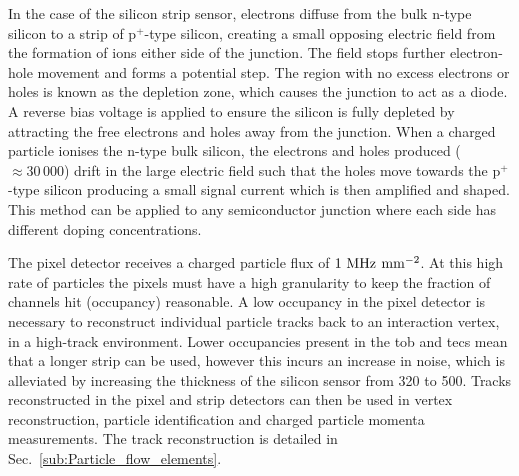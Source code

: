 In the case of the silicon strip sensor, electrons diffuse from the bulk n-type silicon to a strip of p$^{+}$-type silicon, creating a small opposing electric field from the formation of ions either side of the \pnjunc{} junction.
The field stops further electron-hole movement and forms a potential step.
The region with no excess electrons or holes is known as the depletion zone, which causes the junction to act as a diode.
A reverse bias voltage is applied to ensure the silicon is fully depleted by attracting the free electrons and holes away from the \pnjunc{} junction.
When a charged particle ionises the n-type bulk silicon, the electrons and holes produced ($\approx 30\,000$) drift in the large electric field such that the holes move towards the p$^{+}$-type silicon producing a small signal current which is then amplified and shaped.
This method can be applied to any semiconductor junction where each side has different doping concentrations.

The pixel detector receives a charged particle flux of $1\mathrm{~MHz}^{}\mathrm{~mm}^{-2}$. 
At this high rate of particles the pixels must have a high granularity to keep the fraction of channels hit (occupancy) reasonable.
A low occupancy in the pixel detector is necessary to reconstruct individual particle tracks back to an interaction vertex, in a high-track environment.
Lower occupancies present in the \acrshort{tob} and \acrshort{tec}s mean that a longer strip can be used, however this incurs an increase in noise, which is alleviated by increasing the thickness of the silicon sensor from 320\um{} to 500\um{}.
Tracks reconstructed in the pixel and strip detectors can then be used in vertex reconstruction, particle identification and charged particle momenta measurements.
The track reconstruction is detailed in Sec.~\ref{sub:Particle_flow_elements}.





